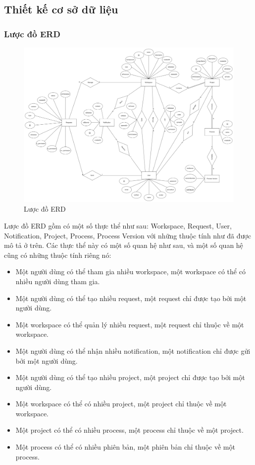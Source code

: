 \subsection{Thiết kế cơ sở dữ liệu}
\subsubsection{Lược đồ ERD}
\begin{figure}[H]
        \centering
        \includegraphics[width=\linewidth]{Content/Phân tích và thiết kế hệ thống/images/erd.png}
        \vspace{0.5cm}
        \caption{Lược đồ ERD}
        \label{fig:Lược đồ ERD}
\end{figure}
\par
Lược đồ ERD gồm có một số thực thể như sau: Workspace, Request,
User, Notification, Project, Process, Process Version với những
thuộc tính như đã được mô tả ở trên. Các thực thể này có một số
quan hệ như sau, và một số quan hệ cũng có những thuộc tính riêng nó:
\begin{itemize}
    \item Một người dùng có thể tham gia nhiều workspace, một
    workspace có thể có nhiều người dùng tham gia.
    \item Một người dùng có thể tạo nhiều request, một request
    chỉ được tạo bởi một người dùng.
    \item Một workspace có thể quản lý nhiều request, một request
    chỉ thuộc về một workspace.
    \item Một người dùng có thể nhận nhiều notification, một
    notification chỉ được gửi bởi một người dùng.
    \item Một người dùng có thể tạo nhiều project, một project
    chỉ được tạo bởi một người dùng.
    \item Một workspace có thể có nhiều project, một project
    chỉ thuộc về một workspace.
    \item Một project có thể có nhiều process, một process
    chỉ thuộc về một project.
    \item Một process có thể có nhiều phiên bản, một phiên bản
    chỉ thuộc về một process.
\end{itemize}

